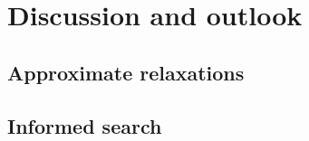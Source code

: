 \chapter{Discussion and outlook} \label{ch:discussion}











\section{Approximate relaxations}



\section{Informed search}

